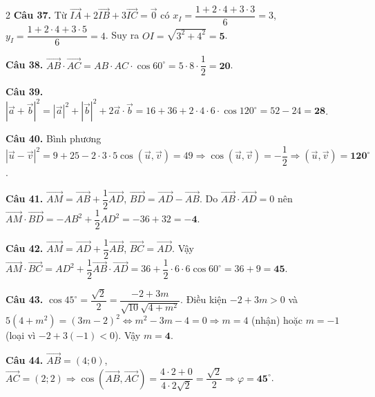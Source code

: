 \documentclass[12pt,a4paper]{article}
\begin{document}
\begin{multicols}{2}
\textbf{Câu 37.} Từ $\vec{IA} + 2\vec{IB} + 3\vec{IC} = \vec{0}$ có $x_I = \dfrac{1 + 2\cdot 4 + 3\cdot 3}{6} = 3$, $y_I = \dfrac{1 + 2\cdot 4 + 3\cdot 5}{6} = 4$. Suy ra $OI = \sqrt{3^2 + 4^2} = \mathbf{5}$.\par\vspace{3pt}

\textbf{Câu 38.} $\vec{AB}\cdot\vec{AC} = AB\cdot AC\cdot \cos 60^\circ = 5\cdot 8\cdot \dfrac{1}{2} = \mathbf{20}$.\par\vspace{3pt}

\textbf{Câu 39.} $|\vec{a}+\vec{b}|^2 = |\vec{a}|^2 + |\vec{b}|^2 + 2\vec{a}\cdot\vec{b} = 16 + 36 + 2\cdot 4\cdot 6\cdot \cos 120^\circ = 52 - 24 = \mathbf{28}$.\par\vspace{3pt}

\textbf{Câu 40.} Bình phương $|\vec{u} - \vec{v}|^2 = 9 + 25 - 2\cdot 3\cdot 5\cos(\vec{u}, \vec{v}) = 49 \Rightarrow \cos(\vec{u}, \vec{v}) = -\dfrac{1}{2} \Rightarrow (\vec{u}, \vec{v}) = \mathbf{120}^\circ$.\par\vspace{3pt}

\textbf{Câu 41.} $\vec{AM} = \vec{AB} + \dfrac{1}{2}\vec{AD}$, $\vec{BD} = \vec{AD} - \vec{AB}$. Do $\vec{AB}\cdot\vec{AD} = 0$ nên $\vec{AM}\cdot\vec{BD} = -AB^2 + \dfrac{1}{2}AD^2 = -36 + 32 = \mathbf{-4}$.\par\vspace{3pt}

\textbf{Câu 42.} $\vec{AM} = \vec{AD} + \dfrac{1}{2}\vec{AB}$, $\vec{BC} = \vec{AD}$. Vậy $\vec{AM}\cdot\vec{BC} = AD^2 + \dfrac{1}{2}\vec{AB}\cdot\vec{AD} = 36 + \dfrac{1}{2}\cdot 6\cdot 6\cos 60^\circ = 36 + 9 = \mathbf{45}$.\par\vspace{3pt}

\textbf{Câu 43.} $\cos 45^\circ = \dfrac{\sqrt{2}}{2} = \dfrac{-2 + 3m}{\sqrt{10}\sqrt{4 + m^2}}$. Điều kiện $-2 + 3m > 0$ và $5(4 + m^2) = (3m - 2)^2 \Leftrightarrow m^2 - 3m - 4 = 0 \Rightarrow m = 4$ (nhận) hoặc $m = -1$ (loại vì $-2+3(-1)<0$). Vậy $m = \mathbf{4}$.\par\vspace{3pt}

\textbf{Câu 44.} $\vec{AB} = (4; 0)$, $\vec{AC} = (2; 2) \Rightarrow \cos(\vec{AB}, \vec{AC}) = \dfrac{4\cdot 2 + 0}{4\cdot 2\sqrt{2}} = \dfrac{\sqrt{2}}{2} \Rightarrow \varphi = \mathbf{45}^\circ$.\par\vspace{3pt}


\end{multicols}
\end{document}
